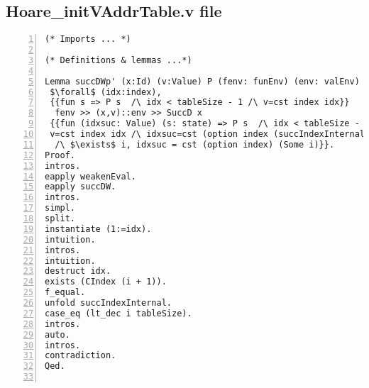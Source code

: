 \begin{appendices}
\section{Hoare\_initVAddrTable.v file} \label{initFile}
\begin{lstlisting}[xleftmargin=-.1\textwidth,
xrightmargin=-.1\textwidth,
mathescape=true,numbers=left]
(* Imports ... *)

(* Definitions & lemmas ...*)

Lemma succDWp' (x:Id) (v:Value) P (fenv: funEnv) (env: valEnv) :
 $\forall$ (idx:index), 
 {{fun s => P s  /\ idx < tableSize - 1 /\ v=cst index idx}} 
  fenv >> (x,v)::env >> SuccD x 
 {{fun (idxsuc: Value) (s: state) => P s  /\ idx < tableSize - 1 /\ 
 v=cst index idx /\ idxsuc=cst (option index (succIndexInternal idx) 
  /\ $\exists$ i, idxsuc = cst (option index) (Some i)}}.
Proof.
intros.
eapply weakenEval.
eapply succDW.
intros. 
simpl. 
split.
instantiate (1:=idx).  
intuition.
intros.
intuition.
destruct idx.
exists (CIndex (i + 1)).
f_equal.
unfold succIndexInternal.
case_eq (lt_dec i tableSize).
intros.
auto.
intros.
contradiction.
Qed.


\end{lstlisting}
\end{appendices}
